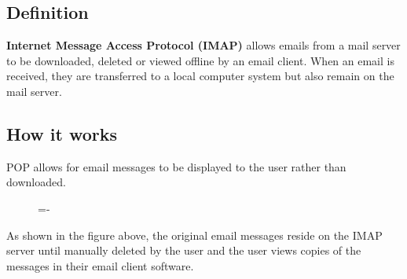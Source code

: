 \documentclass[a4paper]{systems-software}
\begin{document}
\subsection*{Definition}

\textbf{Internet Message Access Protocol (IMAP)} allows emails from a mail server to be downloaded, deleted or viewed offline by an email client. When an email is received, they are transferred to a local computer system but also remain on the mail server.


\subsection*{How it works}

POP allows for email messages to be displayed to the user rather than downloaded.

\begin{figure}[H]
	\lineskip=-\fboxrule
\end{figure}

As shown in the figure above, the original email messages reside on the IMAP server until manually deleted by the user and the user views copies of the messages in their email client software.
\end{document}
